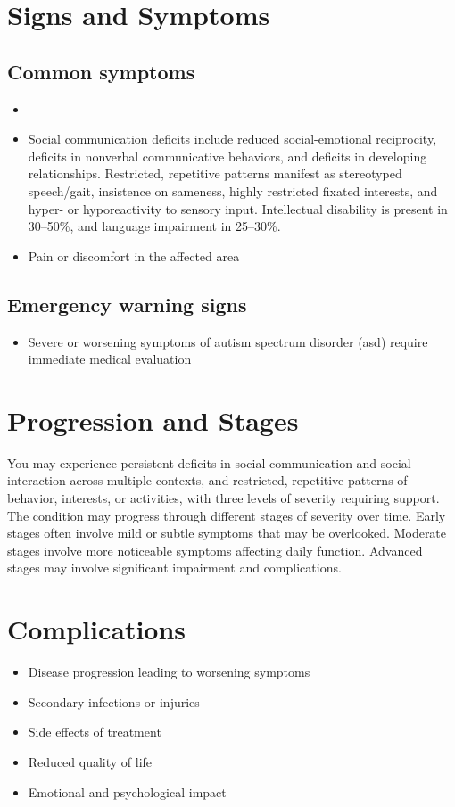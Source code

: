 \section{Signs and Symptoms}
\subsection{Common symptoms}
\begin{itemize}[noitemsep]
  \item \item Social communication deficits include reduced social-emotional reciprocity, deficits in nonverbal communicative behaviors, and deficits in developing relationships. Restricted, repetitive patterns manifest as stereotyped speech/gait, insistence on sameness, highly restricted fixated interests, and hyper- or hyporeactivity to sensory input. Intellectual disability is present in 30--50\%, and language impairment in 25--30\%.
  \item Pain or discomfort in the affected area
  \end{itemize}
\subsection{Emergency warning signs}
\begin{itemize}[noitemsep]
  \item Severe or worsening symptoms of autism spectrum disorder (asd) require immediate medical evaluation
\end{itemize}
\section{Progression and Stages}
You may experience persistent deficits in social communication and social interaction across multiple contexts, and restricted, repetitive patterns of behavior, interests, or activities, with three levels of severity requiring support. The condition may progress through different stages of severity over time. Early stages often involve mild or subtle symptoms that may be overlooked. Moderate stages involve more noticeable symptoms affecting daily function. Advanced stages may involve significant impairment and complications.
\section{Complications}
\begin{itemize}[noitemsep]
  \item Disease progression leading to worsening symptoms
  \item Secondary infections or injuries
  \item Side effects of treatment
  \item Reduced quality of life
  \item Emotional and psychological impact
\end{itemize}
